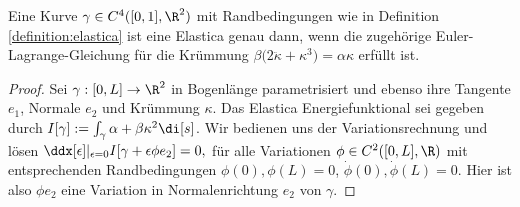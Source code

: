 \documentclass{mythesis}
\begin{document}
\begin{proposition} \label{proposition:elastica_el}
    Eine Kurve $\gamma \in C^4([0,1], \R^2)$ mit Randbedingungen wie in Definition \ref{definition:elastica} ist eine Elastica genau dann, wenn die zugehörige Euler-Lagrange-Gleichung für die Krümmung
    \begin{math}
	\beta\big(2\ddot\kappa + \kappa^3\big) = \alpha\kappa
    \end{math}
    erfüllt ist.
    \begin{proof}
	Sei $\gamma:[0,L] \to \R^2$ in Bogenlänge parametrisiert und ebenso ihre Tangente $e_1$, Normale $e_2$ und Krümmung $\kappa$.
        Das Elastica Energiefunktional sei gegeben durch $I[\gamma] := \int_\gamma \alpha + \beta \kappa^2 \di[s]$.
	Wir bedienen uns der Variationsrechnung und lösen
	\begin{math}
	    \ddx[\epsilon]|_{\epsilon=0} I[\gamma + \epsilon \phi e_2] = 0,
	\end{math}
	für alle Variationen $\phi \in C^2([0,L], \R)$ mit entsprechenden Randbedingungen $\phi(0), \phi(L) = 0$, $\dot\phi(0), \dot\phi(L) = 0$.
       	Hier ist also $\phi e_2$ eine Variation in Normalenrichtung $e_2$ von $\gamma$.


\end{proof}
\end{proposition}
\end{document}
